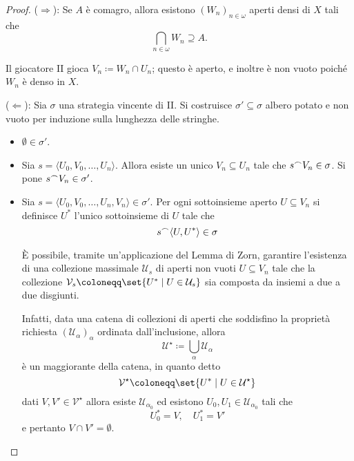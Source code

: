 \documentclass[titlepage]{article}
\newcommand{\1}{\mathds{1}}
\newcommand{\concat}{\null^{\frown}} %
\theoremstyle{definition}%
\theoremstyle{plain}
\theoremstyle{remark}
\begin{document}
\begin{proof}
(\(\Rightarrow\)): Se \(A\) è comagro, allora esistono \((W_{n})_{n \in\omega}\) aperti densi di \(X\) tali che
\begin{equation*}
\bigcap_{n \in\omega} W_{n} \supseteq A.
\end{equation*}

Il giocatore II gioca \(V_{n} \coloneqq W_{n}\cap U_{n}\); questo è aperto, e inoltre è non vuoto poiché \(W_{n}\) è denso in \(X\).

(\(\Leftarrow\)): Sia \(\sigma\) una strategia vincente di II. Si costruisce \(\sigma' \subseteq \sigma\) albero potato e non vuoto per induzione sulla lunghezza delle stringhe.
\begin{itemize}
\item \(\emptyset \in \sigma'\).
\item Sia \(s=\langle U_{0},V_{0},\dots,U_{n}\rangle\). Allora esiste un unico \(V_{n} \subseteq U_{n}\) tale che \(s\concat V_{n} \in \sigma\). Si pone \(s\concat V_{n} \in \sigma'\).
\item Sia \(s = \langle U_{0},V_{0},\dots, U_{n}, V_{n}\rangle \in \sigma'\). Per ogni sottoinsieme aperto \(U \subseteq V_{n}\) si definisce \(U^{*}\) l'unico sottoinsieme di \(U\) tale che
\begin{equation*}
  s\concat \langle U,U^{*}\rangle \in \sigma
\end{equation*}

È possibile, tramite un'applicazione del Lemma di Zorn, garantire l'esistenza di una collezione massimale \(\mathcal{U}_{s}\) di aperti non vuoti \(U \subseteq V_{n}\) tale che la collezione \(\mathcal{V}_{s} \coloneqq \set{U^{*}\mid U \in \mathcal{U}_{s}}\) sia composta da insiemi a due a due disgiunti.

Infatti, data una catena di collezioni di aperti che soddisfino la proprietà richiesta \((\mathcal{U}_{\alpha})_{\alpha}\) ordinata dall'inclusione, allora
\begin{equation*}
\mathcal{U}^{\star}\coloneqq \bigcup_{\alpha} \mathcal{U}_{\alpha}
\end{equation*}
è un maggiorante della catena, in quanto detto
\begin{equation*}
\mathcal{V}^{\star} \coloneqq \set{U^{*}\mid U \in \mathcal{U}^{\star}}
\end{equation*}
dati \(V,V' \in \mathcal{V}^{\star}\) allora esiste \(\mathcal{U}_{\alpha_{0}}\) ed esistono \(U_{0},U_{1} \in \mathcal{U}_{\alpha_{0}}\) tali che
\begin{equation*}
U_{0}^{*}=V,\quad U_{1}^{*} = V'
\end{equation*}
e pertanto \(V\cap V' =\emptyset\).


\end{itemize}
\end{proof}
\end{document}
